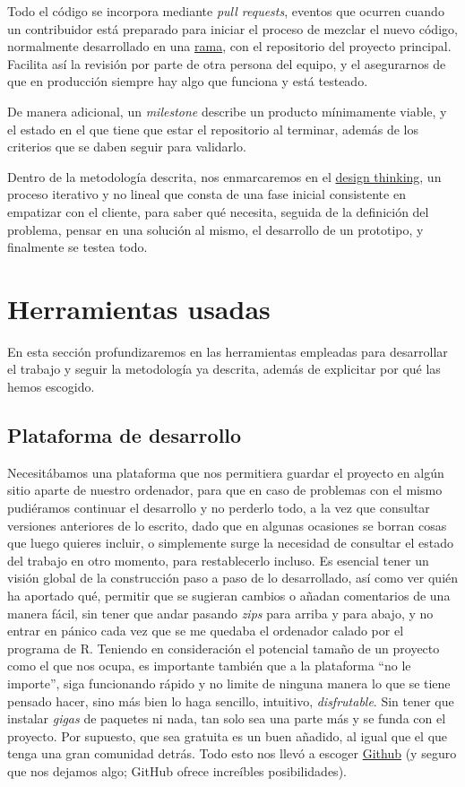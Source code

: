 Todo el código se incorpora mediante \textit{pull requests}, eventos que ocurren cuando un contribuidor está 
preparado para iniciar el proceso de mezclar el nuevo código, normalmente desarrollado en una \href{https://docs.github.com/github/collaborating-with-issues-and-pull-requests/about-branches}{rama}, 
con el repositorio del proyecto principal. Facilita así la revisión por parte de otra persona del equipo, y el 
asegurarnos de que en producción siempre hay algo que funciona y está testeado.

De manera adicional, un \textit{milestone} describe un producto mínimamente viable, y el estado en el que tiene 
que estar el repositorio al terminar, además de los criterios que se daben seguir 
para validarlo.

Dentro de la metodología descrita, nos enmarcaremos en el \href{https://www.iebschool.com/blog/design-thinking-agile-scrum/}{design thinking}, 
un proceso iterativo y no lineal que consta de una fase inicial consistente en empatizar con el 
cliente, para saber qué necesita, seguida de la definición del problema, pensar en una solución al 
mismo, el desarrollo de un prototipo, y finalmente se testea todo. 

\section{Herramientas usadas}
En esta sección profundizaremos en las herramientas empleadas para desarrollar el trabajo y seguir 
la metodología ya descrita, además de explicitar por qué las hemos escogido.

\subsection{Plataforma de desarrollo} 
Necesitábamos una plataforma que nos permitiera guardar el proyecto en algún sitio aparte de nuestro 
ordenador, para que en caso de problemas con el mismo pudiéramos continuar el desarrollo y no perderlo 
todo, a la vez que consultar versiones anteriores de lo escrito, dado que en algunas ocasiones se borran 
cosas que luego quieres incluir, o simplemente surge la necesidad de consultar el estado del trabajo en 
otro momento, para restablecerlo incluso. Es esencial tener un visión global de la construcción paso a paso 
de lo desarrollado, así como ver quién ha aportado qué, permitir que se sugieran cambios o añadan comentarios 
de una manera fácil, sin tener que andar pasando \textit{zips} para arriba y para abajo, y no entrar en 
pánico cada vez que se me quedaba el ordenador calado por el programa de R. Teniendo en consideración 
el potencial tamaño de un proyecto como el que nos ocupa, es importante también que a la plataforma ``no le importe'', 
siga funcionando rápido y no limite de ninguna manera lo que se tiene pensado hacer, sino más bien lo haga sencillo, 
intuitivo, \textit{disfrutable}. Sin tener que instalar \textit{gigas} de paquetes ni nada, tan solo sea una parte 
más y se funda con el proyecto. Por supuesto, que sea gratuita es un buen añadido, al igual que el que tenga 
una gran comunidad detrás. Todo esto nos llevó a escoger \href{https://github.com/}{Github} (y seguro que nos 
dejamos algo; GitHub ofrece increíbles posibilidades).

